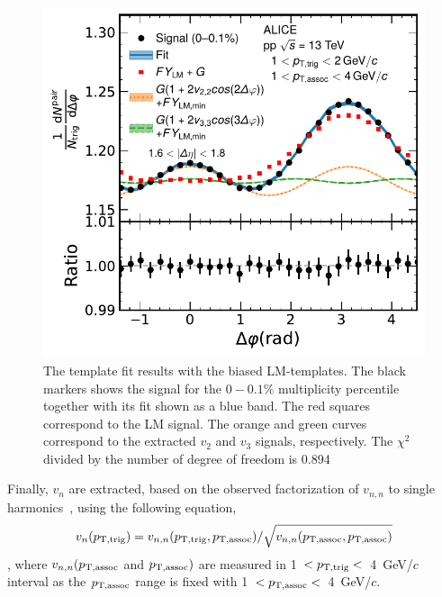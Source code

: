 \begin{figure}[h!]
	\centering
	\includegraphics[width=0.6 \textwidth]{figures/Fig1_FlowExt.pdf} 
	\caption{The template fit results with the biased LM-templates. The black markers shows the signal for the $0-0.1\%$ multiplicity percentile together with its fit shown as a blue band. The red squares correspond to the LM signal. The orange and green curves correspond to the extracted $v_2$ and $v_3$ signals, respectively. The $\chi^{2}$ divided by the number of degree of freedom is 0.894}
	\label{fig:flowext}
\end{figure}

Finally, $v_{n}$ are extracted, based on the observed factorization of $v_{n,n}$ to single harmonics~\cite{ATLAS:2015hzw,ATLAS:2016yzd}, using the following equation\quad,
\begin{eqnarray}
v_{n}(p_{\rm{T,trig}}) = v_{n,n}(p_{\rm{T,trig}}, p_{\rm{T,assoc}}) / \sqrt{ v_{n,n}(p_{\rm{T,assoc}},p_{\rm{T,assoc}})}
\end{eqnarray}
, where $v_{n,n}(p_{\rm{T,assoc}}$ and $p_{\rm{T,assoc}})$ are measured in 1~$<p_{\rm{T,trig}}<$~4~GeV/$c$ interval as the $p_{\rm{T,assoc}}$ range is fixed with 1~$<p_{\rm{T,assoc}}<$~4~GeV/$c$.

